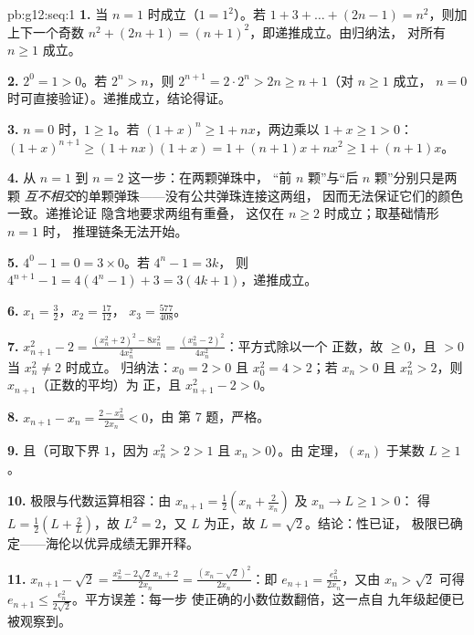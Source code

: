 \begin{solution}{pb:g12:seq:1}
\textbf{1.} 当 $n = 1$ 时成立（$1 = 1^2$）。若
$1 + 3 + \dots + (2n - 1) = n^2$，则加上下一个奇数
$n^2 + (2n + 1) = (n + 1)^2$，即递推成立。由归纳法，
对所有 $n \geq 1$ 成立。

\textbf{2.} $2^0 = 1 > 0$。若 $2^n > n$，则
$2^{n+1} = 2 \cdot 2^n > 2n \geq n + 1$（对 $n \geq 1$ 成立，
$n = 0$ 时可直接验证）。递推成立，结论得证。

\textbf{3.} $n = 0$ 时，$1 \geq 1$。若
$(1 + x)^n \geq 1 + nx$，两边乘以 $1 + x \geq 1 > 0$：
$(1 + x)^{n+1} \geq (1 + nx)(1 + x) = 1 + (n + 1)x + nx^2
\geq 1 + (n + 1)x$。

\textbf{4.} 从 $n = 1$ 到 $n = 2$ 这一步：在两颗弹珠中，
“前 $n$ 颗”与“后 $n$ 颗”分别只是两颗
\emph{互不相交}的单颗弹珠——没有公共弹珠连接这两组，
因而无法保证它们的颜色一致。递推论证
隐含地要求两组有重叠，
这仅在 $n \geq 2$ 时成立；取基础情形 $n = 1$ 时，
推理链条无法开始。

\textbf{5.} $4^0 - 1 = 0 = 3 \times 0$。若 $4^n - 1 = 3k$，
则 $4^{n+1} - 1 = 4(4^n - 1) + 3 = 3(4k + 1)$，递推成立。

\textbf{6.} $x_1 = \frac32$，$x_2 = \frac{17}{12}$，
$x_3 = \frac{577}{408}$。

\textbf{7.} $x_{n+1}^2 - 2 = \frac{(x_n^2 + 2)^2 - 8x_n^2}
{4x_n^2} = \frac{(x_n^2 - 2)^2}{4 x_n^2}$：平方式除以一个
正数，故 $\geq 0$，且 $> 0$ 当 $x_n^2 \neq 2$ 时成立。
归纳法：$x_0 = 2 > 0$ 且 $x_0^2 = 4 > 2$；若 $x_n > 0$
且 $x_n^2 > 2$，则 $x_{n+1}$（正数的平均）为
正，且 $x_{n+1}^2 - 2 > 0$。

\textbf{8.} $x_{n+1} - x_n = \frac{2 - x_n^2}{2x_n} < 0$，由
第 7 题，严格。

\textbf{9.} 且（可取下界 $1$，因为
$x_n^2 > 2 > 1$ 且 $x_n > 0$）。由
定理，$(x_n)$ 于某数 $L \geq 1$。

\textbf{10.} 极限与代数运算相容：由
$x_{n+1} = \frac12\left(x_n + \frac{2}{x_n}\right)$ 及
$x_n \to L \geq 1 > 0$：
得 $L = \frac12\left(L + \frac2L\right)$，故 $L^2 = 2$，又 $L$
为正，故 $L = \sqrt2$。结论：性已证，
极限已确定——海伦以优异成绩无罪开释。

\textbf{11.} $x_{n+1} - \sqrt2 = \frac{x_n^2 - 2\sqrt2\,x_n +
2}{2x_n} = \frac{(x_n - \sqrt2)^2}{2x_n}$：即
$e_{n+1} = \frac{e_n^2}{2x_n}$，又由 $x_n > \sqrt2$ 可得
$e_{n+1} \leq \frac{e_n^2}{2\sqrt2}$。平方误差：每一步
使正确的小数位数翻倍，这一点自
九年级起便已被观察到。


\end{solution}
